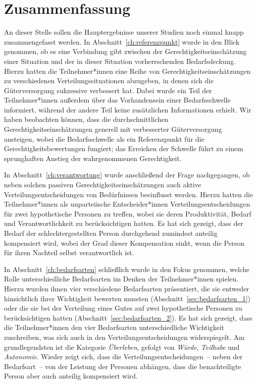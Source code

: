 \documentclass[justified,nobib,nohyper,symmetric,twoside]{tufte-book}
\begin{document}
\chapter{Zusammenfassung}\label{ch:zusammenfassung}
An dieser Stelle sollen die Hauptergebnisse unserer Studien noch einmal knapp zusammengefasst werden.
In Abschnitt~\ref{ch:referenzpunkt} wurde in den Blick genommen, ob es eine Verbindung gibt zwischen der Gerechtigkeitseinschätzung einer Situation und der in dieser Situation vorherrschenden Bedarfsdeckung.
Hierzu hatten die Teilnehmer*innen eine Reihe von Gerechtigkeitseinschätzungen zu verschiedenen Verteilungssituationen abzugeben, in denen sich die Güterversorgung sukzessive verbessert hat.
Dabei wurde ein Teil der Teilnehmer*innen außerdem über das Vorhandensein einer Bedarfsschwelle informiert, während der andere Teil keine zusätzlichen Informationen erhielt.
Wir haben beobachten können, dass die durchschnittlichen Gerechtigkeitseinschätzungen generell mit verbesserter Güterversorgung ansteigen, wobei die Bedarfsschwelle als ein Referenzpunkt für die Gerechtigkeitsbewertungen fungiert; das Erreichen der Schwelle führt zu einem sprunghaften Anstieg der wahrgenommenen Gerechtigkeit.


In Abschnitt~\ref{ch:verantwortung} wurde anschließend der Frage nachgegangen, ob neben solchen passiven Gerechtigkeitseinschätzungen auch aktive Verteilungsentscheidungen von Bedürfnissen beeinflusst werden.
Hierzu hatten die Teilnehmer*innen als unparteiische Entscheider*innen Verteilungsentscheidungen für zwei hypothetische Personen zu treffen, wobei sie deren Produktivität, Bedarf und Verantwortlichkeit zu berücksichtigen hatten.
Es hat sich gezeigt, dass der Bedarf der schlechtergestellten Person durchgehend zumindest anteilig kompensiert wird, wobei der Grad dieser Kompensation sinkt, wenn die Person für ihren Nachteil selbst verantwortlich ist.

In Abschnitt~\ref{ch:bedarfsarten} schließlich wurde in den Fokus genommen, welche Rolle unterschiedliche Bedarfsarten im Denken der Teilnehmer*innen spielen.
Hierzu wurden ihnen vier verschiedene Bedarfsarten präsentiert, die sie entweder hinsichtlich ihrer Wichtigkeit bewerten mussten (Abschnitt~\ref{sec:bedarfsarten_1}) oder die sie bei der Verteilung eines Gutes auf zwei hypothetische Personen zu berücksichtigen hatten (Abschnitt~\ref{sec:bedarfsarten_2}).
Es hat sich gezeigt, dass die Teilnehmer*innen den vier Bedarfsarten unterschiedliche Wichtigkeit zuschreiben, was sich auch in den Verteilungsentscheidungen widerspiegelt.
Am grundlegendsten ist die Kategorie \textit{Überleben}, gefolgt von \textit{Würde}, \textit{Teilhabe} und \textit{Autonomie}.
Wieder zeigt sich, dass die Verteilungsentscheidungen~-- neben der Bedarfsart~-- von der Leistung der Personen abhängen, dass die benachteiligte Person aber auch anteilig kompensiert wird.
\end{document}
